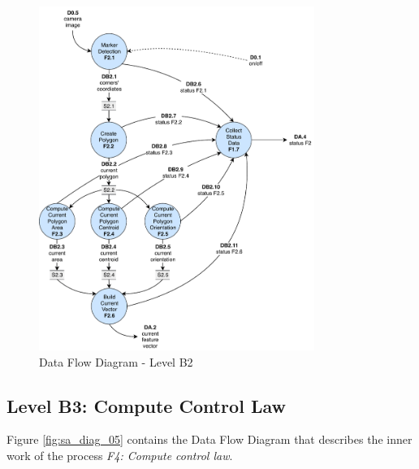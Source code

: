 \begin{figure}[!htb]
	\caption{Data Flow Diagram - Level B2}
	\label{fig:sa_diag_04}
	\centering
	\includegraphics[width=0.8\textwidth]{content/chapter_03/images/sa_diagram_04.pdf}
\end{figure}

\pagebreak

\subsection{Level B3: Compute Control Law}
\label{sec:level-B3}

Figure \ref{fig:sa_diag_05} contains the Data Flow Diagram that describes the inner work of the process \textit{F4: Compute control law}.

